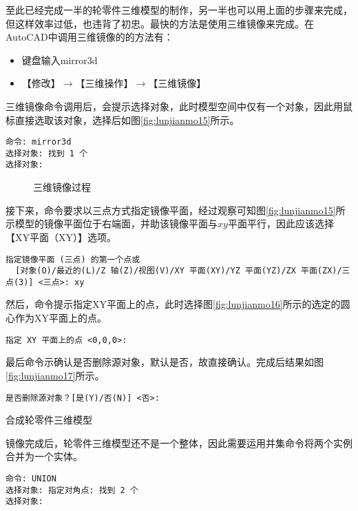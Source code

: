 \begin{procedure}
至此已经完成一半的轮零件三维模型的制作，另一半也可以用上面的步骤来完成，但这样效率过低，也违背了初忠。最快的方法是使用三维镜像来完成。在AutoCAD中调用三维镜像的的方法有：
\begin{itemize}
\item 键盘输入mirror3d
\item 【修改】$\rightarrow $【三维操作】$\rightarrow $【三维镜像】
\end{itemize}

三维镜像命令调用后，会提示选择对象，此时模型空间中仅有一个对象，因此用鼠标直接选取该对象，选择后如图\ref{fig:lunjianmo15}所示。
\begin{lstlisting}
命令: mirror3d
选择对象: 找到 1 个
选择对象:
\end{lstlisting}

\begin{figure}[htbp]
\centering
{}\hspace{20pt}
\hspace{20pt}
\caption{三维镜像过程}
\end{figure}

接下来，命令要求以三点方式指定镜像平面，经过观察可知图\ref{fig:lunjianmo15}所示模型的镜像平面位于右端面，并助该镜像平面与$xy$平面平行，因此应该选择【XY平面（XY）】选项。
\begin{lstlisting}
指定镜像平面 (三点) 的第一个点或
  [对象(O)/最近的(L)/Z 轴(Z)/视图(V)/XY 平面(XY)/YZ 平面(YZ)/ZX 平面(ZX)/三点(3)] <三点>: xy
\end{lstlisting}

然后，命令提示指定XY平面上的点，此时选择图\ref{fig:lunjianmo16}所示的选定的圆心作为XY平面上的点。
\begin{lstlisting}
指定 XY 平面上的点 <0,0,0>:
\end{lstlisting}

最后命令示确认是否删除源对象，默认是否，故直接确认。完成后结果如图\ref{fig:lunjianmo17}所示。
\begin{lstlisting}
是否删除源对象？[是(Y)/否(N)] <否>:
\end{lstlisting}

\item 合成轮零件三维模型

镜像完成后，轮零件三维模型还不是一个整体，因此需要运用并集命令将两个实例合并为一个实体。
\begin{lstlisting}
命令: UNION
选择对象: 指定对角点: 找到 2 个
选择对象:
\end{lstlisting}


\end{procedure}
